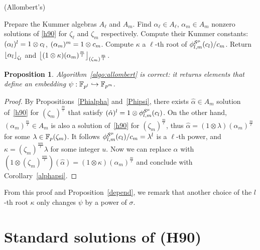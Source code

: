\documentclass{sig-alternate}
\newtheorem{proposition}[theorem]{Proposition}
\begin{document}
\begin{algorithm}
  \caption{(Allombert's)}
  \label{algo:allombert}
  \begin{algorithmic}[1]
  \STATE Prepare the Kummer algebras $A_\ell$ and $A_m$.
  \STATE Find $\alpha_\ell\in A_\ell$, $\alpha_m\in A_m$ nonzero solutions of \eqref{h90} for $\zeta_\ell$
  and $\zeta_m$ respectively.
  \STATE Compute their Kummer constants: $(\alpha_l)^l=1\otimes c_l$, 
  $(\alpha_m)^m=1\otimes c_m$.
  \STATE Compute $\kappa$ a $\ell$-th root of ${\phi^{\mathcal{S}^\mu}_{{l},{m}}}(c_l)/c_m$.
  \STATE Return $\left\lfloor \alpha_{l} \right\rfloor_{\zeta_l}$ and $\left\lfloor (1\otimes\kappa)(\alpha_m)^{\frac{m}{l}} \right\rfloor_{(\zeta_m)^{\frac{m}{l}}}$.
  \end{algorithmic}
\end{algorithm}
\begin{proposition}
  Algorithm~\ref{algo:allombert} is correct: it returns elements that define an
  embedding $\psi:\mathbb{F}_{p^l}\hookrightarrow\mathbb{F}_{p^m}$.
\end{proposition}
\begin{proof}
By Propositions~\ref{Phialpha} and~\ref{Phipsi}, there exists $\hat{\alpha}\in A_m$
solution of~\eqref{h90} for $(\zeta_m)^{\frac{m}{\ell}}$ that satisfy $(\hat{\alpha})^l=1\otimes{\phi^{\mathcal{S}^\mu}_{{l},{m}}}(c_l)$.
On the other hand, $(\alpha_m)^{\frac{m}{\ell}}\in A_m$ is also a solution of~\eqref{h90} for $(\zeta_m)^{\frac{m}{\ell}}$,
thus $\hat{\alpha}=(1\otimes\lambda)(\alpha_m)^{\frac{m}{\ell}}$ for some $\lambda\in\mathbb{F}_{p}(\zeta_m)$.
It follows ${\phi^{\mathcal{S}^\mu}_{{l},{m}}}(c_l)/c_m=\lambda^l$ is a $\ell$-th power,
and $\kappa = (\zeta_{m})^{\frac{um}{\ell}}\lambda$ for some integer $u$.
Now we can replace $\hat{\alpha}$
with $(1\otimes(\zeta_{m})^{\frac{um}{\ell}})(\hat{\alpha})=(1\otimes\kappa)(\alpha_m)^{\frac{m}{\ell}}$
and conclude with Corollary~\ref{alphapsi}.
\end{proof}
From this proof and Proposition~\ref{depend}, we remark that another choice of the $l$-th root $\kappa$
only changes $\psi$ by a power of $\sigma$.
    
\section{Standard solutions of (H90)}
\label{sec:compatibleH90}
\end{document}
